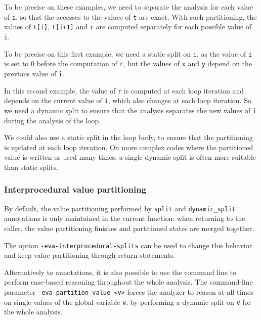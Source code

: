 \documentclass{frama-c-book}
\begin{document}
To be precise on these examples, we need to separate the analysis for each value
of \lstinline|i|, so that the accesses to the values of \lstinline|t| are exact.
With such partitioning, the values of \lstinline|t[i]|, \lstinline|t[i+1]| and
\lstinline|r| are computed separately for each possible value of \lstinline|i|.


To be precise on this first example, we need a static split on \lstinline|i|, as
the value of \lstinline|i| is set to 0 before the computation of \lstinline|r|,
but the values of \lstinline|x| and \lstinline|y| depend on the previous value
of \lstinline|i|.


In this second example, the value of \lstinline|r| is computed at each
loop iteration and depends on the current value of \lstinline|i|, which
also changes at each loop iteration.
So we need a dynamic split to ensure that the analysis separates the new
values of \lstinline|i| during the analysis of the loop.

We could also use a static split in the loop body, to ensure that the
partitioning is updated at each loop iteration. On more complex codes where
the partitioned value is written or used many times, a single dynamic split
is often more suitable than static splits.



\subsubsection{Interprocedural value partitioning}

By default, the value partitioning performed by \lstinline|split|
and \lstinline|dynamic_split| annotations is only maintained in the current
function: when returning to the caller, the value partitioning
finishes and partitioned states are merged together.

The option \lstinline|-eva-interprocedural-splits| can be used to change this
behavior and keep value partitioning through return statements.

Alternatively to annotations, it is also possible to use the command line to
perform case-based reasoning throughout the whole analysis. The command-line parameter
\lstinline|-eva-partition-value <v>| forces the analyzer to reason at all times
on single values of the global variable \lstinline|v|, by performing a
dynamic split on \lstinline|v| for the whole analysis.
\end{document}
